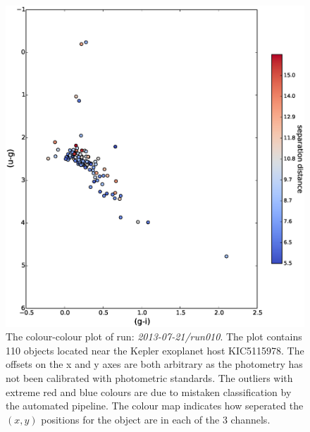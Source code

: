 \begin{figure}
\centering
\includegraphics[width=140mm]{images/2013-07-21-run010-2colour.eps}
\caption{The colour-colour plot of run: \emph{2013-07-21/run010}. The plot contains 110 objects located near the Kepler exoplanet host KIC5115978. The offsets on the x and y axes are both arbitrary as the photometry has not been calibrated with photometric standards. The outliers with extreme red and blue colours are due to mistaken classification by the automated pipeline. The colour map indicates how seperated the $(x, y)$ positions for the object are in each of the 3 channels.}
\label{fig:run010-2colour}
\end{figure}

